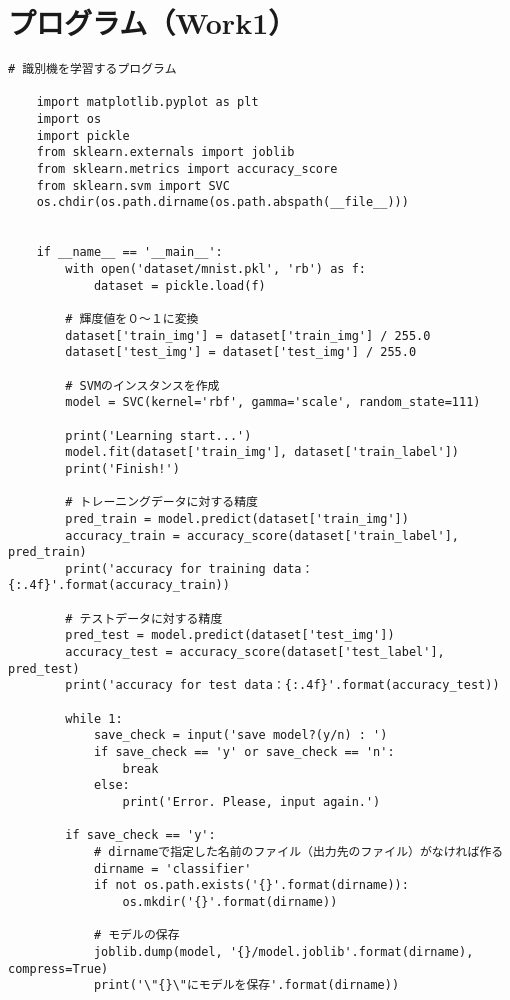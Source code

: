 \section{プログラム（Work1）}
\begin{lstlisting}[caption=SVM]
    # 識別機を学習するプログラム

    import matplotlib.pyplot as plt
    import os
    import pickle
    from sklearn.externals import joblib
    from sklearn.metrics import accuracy_score
    from sklearn.svm import SVC
    os.chdir(os.path.dirname(os.path.abspath(__file__)))


    if __name__ == '__main__':
        with open('dataset/mnist.pkl', 'rb') as f:
            dataset = pickle.load(f)

        # 輝度値を０～１に変換
        dataset['train_img'] = dataset['train_img'] / 255.0
        dataset['test_img'] = dataset['test_img'] / 255.0

        # SVMのインスタンスを作成
        model = SVC(kernel='rbf', gamma='scale', random_state=111)

        print('Learning start...')
        model.fit(dataset['train_img'], dataset['train_label'])
        print('Finish!')
        
        # トレーニングデータに対する精度
        pred_train = model.predict(dataset['train_img'])
        accuracy_train = accuracy_score(dataset['train_label'], pred_train)
        print('accuracy for training data：{:.4f}'.format(accuracy_train))

        # テストデータに対する精度
        pred_test = model.predict(dataset['test_img'])
        accuracy_test = accuracy_score(dataset['test_label'], pred_test)
        print('accuracy for test data：{:.4f}'.format(accuracy_test))

        while 1:
            save_check = input('save model?(y/n) : ')
            if save_check == 'y' or save_check == 'n':
                break
            else:
                print('Error. Please, input again.')
        
        if save_check == 'y':
            # dirnameで指定した名前のファイル（出力先のファイル）がなければ作る
            dirname = 'classifier'
            if not os.path.exists('{}'.format(dirname)):
                os.mkdir('{}'.format(dirname))
            
            # モデルの保存
            joblib.dump(model, '{}/model.joblib'.format(dirname), compress=True)
            print('\"{}\"にモデルを保存'.format(dirname))
            
\end{lstlisting}
